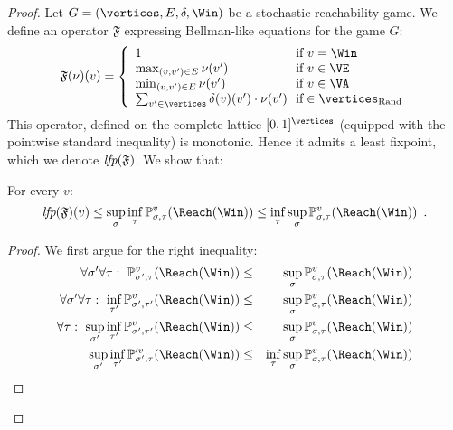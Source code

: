 \begin{proof}
  Let $G = (\vertices,E,\delta,\Win)$ be a stochastic reachability
  game.  We define an operator $\mathfrak{F}$ expressing Bellman-like
  equations for the game $G$:
  \[
  \mathfrak{F}(\nu)(v) = \left\{\begin{array}{l@{~~}l}
      1 & \text{if}\ v = \Win \\
      \max_{(v,v') \in E} \nu(v') & \text{if}\ v \in \VE \\
      \min_{(v,v') \in E} \nu(v') & \text{if}\ v \in \VA \\
      \sum_{v' \in \vertices} \delta(v)(v') \cdot \nu(v') & \text{if} \in \Randomvertices
    \end{array}\right.
  \]
  This operator, defined on the complete lattice $[0,1]^{\vertices}$
  (equipped with the pointwise standard inequality) is
  monotonic. Hence it admits a least fixpoint, which we denote
  $\textit{lfp}(\mathfrak{F})$.  We show that:
  \begin{lemma}
    \label{6-lem:lfpgeval}
    For every $v$:
    \[
    \lfp(\mathfrak{F}) (v) \le \sup_\sigma \inf_\tau
    \probm_{\sigma,\tau}^v(\Reach(\Win)) \le \inf_\tau \sup_\sigma
    \probm_{\sigma,\tau}^v(\Reach(\Win)) \enspace.
    \]
  \end{lemma}
  \begin{proof}
    We first argue for the right inequality:
    \begin{eqnarray*}
      \forall \sigma' \forall \tau:\
      \probm_{\sigma',\tau}^v(\Reach(\Win)) & \le & \sup_\sigma
      \probm_{\sigma,\tau}^v(\Reach(\Win)) \\
      \forall \sigma'\forall \tau :\  \inf_{\tau'}
      \probm_{\sigma',\tau'}^v(\Reach(\Win)) & \le & \sup_\sigma
      \probm_{\sigma,\tau}^v(\Reach(\Win)) \\
      \forall \tau:\ \sup_{\sigma'} \inf_{\tau'}
      \probm_{\sigma',\tau'}^v(\Reach(\Win)) & \le & \sup_\sigma
      \probm_{\sigma,\tau}^v(\Reach(\Win)) \\
      \sup_{\sigma'} \inf_{\tau'}
      \probm_{\sigma',\tau}'^v(\Reach(\Win)) & \le & \inf_{\tau} \sup_\sigma
      \probm_{\sigma,\tau}^v(\Reach(\Win)) 
    \end{eqnarray*}


\end{proof}
\end{proof}
